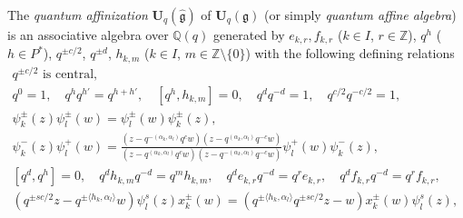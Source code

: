 \documentclass[12pt]{amsart}
\def\Bbb{\mathbb}
\theoremstyle{definition}
\theoremstyle{remark}
\numberwithin{equation}{subsection}
\newcommand{\Z}{{\Bbb Z}}
\newcommand{\Q}{{\Bbb Q}}
\newcommand{\Uq}{{\mathbf U}_q(\mathfrak g)} %
\newcommand{\Ua}{{\mathbf U}_q(\widehat{\mathfrak g})} %
\begin{document}
The {\it quantum affinization\/} $\Ua$ of $\Uq$ (or simply {\it
quantum affine algebra\/}) is an associative algebra over $\Q(q)$
generated by $e_{k,r}, f_{k,r}$ ($k\in I$, $r\in\Z$), $q^h$ ($h \in
P^*$), $q^{\pm c/2}$, $q^{\pm d}$, $h_{k,m}$ ($k\in I$, $m\in
\Z\setminus\{0\}$) with the following defining relations
{\allowdisplaybreaks[4]
\begin{gather}
  \text{$q^{\pm c/2}$ is central,} \label{eq:relCcent}\\
%
  q^0 = 1, \quad q^h q^{h'} = q^{h+h'}, \quad
  [q^h, h_{k,m}] = 0, \quad q^{d} q^{-d} = 1, \quad
  q^{c/2} q^{-c/2} = 1, \label{eq:relHH}\\
%
%
  \psi_k^\pm(z) \psi_l^\pm(w) = \psi_l^\pm(w) \psi_k^\pm(z),
  \label{eq:relHH2}\\
%
  \psi_k^-(z) \psi_l^+(w) =
   \frac{(z - q^{-(\alpha_k,\alpha_l)}q^c w)
         (z - q^{(\alpha_k,\alpha_l)}q^{-c} w)}
        {(z - q^{(\alpha_k,\alpha_l)}q^c w)
         (z - q^{-(\alpha_k,\alpha_l)}q^{-c} w)}
   \psi_l^+(w) \psi_k^-(z)
  ,\label{eq:relHH3}\\
%
  [ q^{d}, q^h ] = 0, \quad q^d h_{k,m} q^{-d} = q^m h_{k,m},
  \quad
  q^d e_{k,r} q^{-d} = q^r e_{k,r}, \quad
  q^d f_{k,r} q^{-d} = q^r f_{k,r}, \label{eq:relD}
\\
  ( q^{\pm sc/2} z - q^{\pm \langle h_k,\alpha_l\rangle} w)
    \psi_l^s(z) x_k^\pm(w) =
  ( q^{\pm\langle h_k,\alpha_l\rangle} q^{\pm sc/2} z -  w)
    x^\pm_k(w) \psi_l^s(z), \quad
    \label{eq:relHE}
\\
%
%

\end{gather}}
\end{document}
